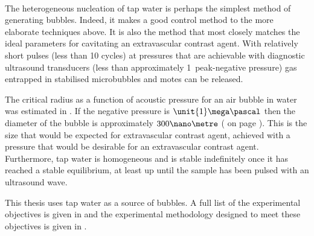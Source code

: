 {\item[Heterogeneous nucleation of tap water:]\hfill \\
  The heterogeneous nucleation of tap water is perhaps the simplest method of generating bubbles.
  Indeed, it makes a good control method to the more elaborate techniques above.
  It is also the method that most closely matches the ideal parameters for cavitating an extravascular contrast agent.
  With relatively short pulses (less than 10 cycles) at pressures that are achievable with diagnostic ultrasound transducers 
  (less than approximately \unit{1}\mega\pascal\ peak-negative pressure)
  gas entrapped in stabilised microbubbles and motes can be released\cite{Willard1953}.
  
  The critical radius as a function of acoustic pressure for an air bubble in water was estimated in .
  If the negative pressure is  $\unit{1}\mega\pascal$ then the diameter of the bubble is approximately $300\nano\metre$
( on page \pageref{fig:cnt:criticalRadius}).
  This is the size that would be expected for extravascular contrast agent,
  achieved with a pressure that would be desirable for an extravascular contrast agent.
  Furthermore, tap water is homogeneous and is stable indefinitely once it has reached a stable equilibrium,
  at least up until the sample has been pulsed with an ultrasound wave.
  
}  
This thesis uses tap water as a source of bubbles.
A full list of the experimental objectives is given in  
and the experimental methodology designed to meet these objectives is given in .


